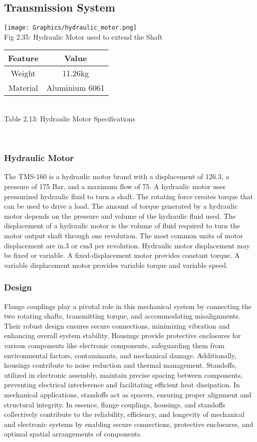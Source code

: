 \documentclass[a4,10pt]{report}
\begin{document}
\subsection{Transmission System}
\begin{center}
    \texttt{[image: Graphics/hydraulic\_motor.png]} \\
    \normalsize{Fig 2.35: Hydraulic Motor used to extend the Shaft}
\end{center}
\begin{center}
\begin{tabular}{|c|c|}
    \hline
    Feature & Value \\
    \hline
    Weight & 11.26kg \\
    Material & Aluminium 6061 \\
    \hline
\end{tabular} \\
\normalsize{Table 2.13: Hydraulic Motor Specifications} \\
\end{center} \\


\subsubsection{Hydraulic Motor}
The TMS-160 is a hydraulic motor brand with a displacement of 126.3, a pressure of 175 Bar, and a maximum flow of 75. A hydraulic motor uses pressurized hydraulic fluid to turn a shaft. The rotating force creates torque that can be used to drive a load. The amount of torque generated by a hydraulic motor depends on the pressure and volume of the hydraulic fluid used. The displacement of a hydraulic motor is the volume of fluid required to turn the motor output shaft through one revolution. The most common units of motor displacement are in.3 or cm3 per revolution. Hydraulic motor displacement may be fixed or variable. A fixed-displacement motor provides constant torque. 
A variable displacement motor provides variable torque and variable speed.
\subsubsection{Design}
Flange couplings play a pivotal role in this mechanical system by connecting the two rotating shafts, transmitting torque, and accommodating misalignments. Their robust design ensures secure connections, minimizing vibration and enhancing overall system stability. Housings provide protective enclosures for various components like electronic components, safeguarding them from environmental factors, contaminants, and mechanical damage. Additionally, housings contribute to noise reduction and thermal management. Standoffs, utilized in electronic assembly, maintain precise spacing between components, preventing electrical interference and facilitating efficient heat dissipation. In mechanical applications, standoffs act as spacers, ensuring proper alignment and structural integrity. In essence, flange couplings, housings, and standoffs collectively contribute to the reliability, efficiency, and longevity of mechanical and electronic systems by enabling secure connections, protective enclosures, and optimal spatial arrangements of components.
\end{document}
